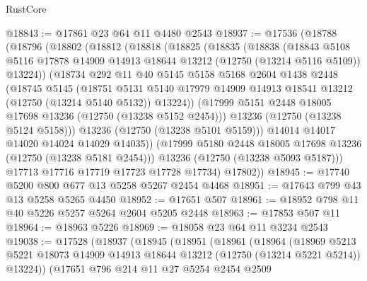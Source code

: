 \begin{lexlean}{RustCore}
\begin{coremodule}
@18843 := @17861 @23 @64 @11 @4480 @2543
@18937 := @17536
    (@18788
      (@18796
        (@18802
          (@18812
            (@18818
              (@18825
                (@18835
                  (@18838
                    (@18843
                      @5108
                      @5116
                      @17878
                      @14909
                      @14913
                      @18644
                      @13212
                      (@12750 (@13214 @5116 @5109))
                      @13224))
                  (@18734
                    @292
                    @11
                    @40
                    @5145
                    @5158
                    @5168
                    @2604
                    @1438
                    @2448
                    (@18745
                      @5145
                      (@18751
                        @5131
                        @5140
                        @17979
                        @14909
                        @14913
                        @18541
                        @13212
                        (@12750 (@13214 @5140 @5132))
                        @13224))
                    (@17999 @5151 @2448 @18005 @17698 @13236 (@12750 (@13238 @5152 @2454)))
                    @13236
                    (@12750 (@13238 @5124 @5158)))
                  @13236
                  (@12750 (@13238 @5101 @5159)))
                @14014
                @14017
                @14020
                @14024
                @14029
                @14035))
            (@17999 @5180 @2448 @18005 @17698 @13236 (@12750 (@13238 @5181 @2454)))
            @13236
            (@12750 (@13238 @5093 @5187)))
          @17713
          @17716
          @17719
          @17723
          @17728
          @17734)
        @17802))
@18945 := @17740 @5200 @800 @677 @13 @5258 @5267 @2454 @4468
@18951 := @17643 @799 @43 @13 @5258 @5265 @4450
@18952 := @17651 @507
@18961 := @18952 @798 @11 @40 @5226 @5257 @5264 @2604 @5205 @2448
@18963 := @17853 @507 @11
@18964 := @18963 @5226
@18969 := @18058 @23 @64 @11 @3234 @2543
@19038 := @17528
    (@18937
      (@18945
        (@18951
          (@18961
            (@18964
              (@18969
                @5213
                @5221
                @18073
                @14909
                @14913
                @18644
                @13212
                (@12750 (@13214 @5221 @5214))
                @13224))
            (@17651
              @796
              @214
              @11
              @27
              @5254
              @2454
              @2509

\end{coremodule}
\end{lexlean}
